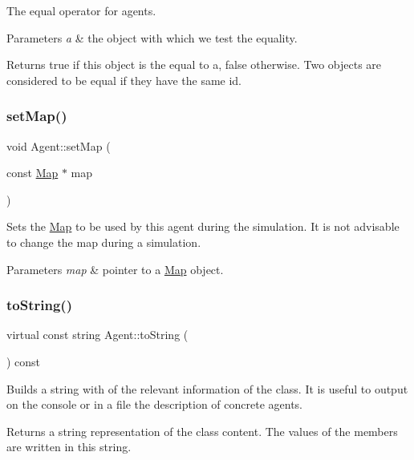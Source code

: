 The equal operator for agents. 
\begin{DoxyParams}{Parameters}
{\em a} & the object with which we test the equality. \\
\hline
\end{DoxyParams}
\begin{DoxyReturn}{Returns}
true if this object is the equal to a, false otherwise. Two objects are considered to be equal if they have the same id. 
\end{DoxyReturn}
\mbox{\label{class_agent_a87a661874cffb03fa9e474e872810260}} 
\subsubsection{\texorpdfstring{setMap()}{setMap()}}
{\footnotesize\ttfamily void Agent\+::set\+Map (\begin{DoxyParamCaption}\item[{const \mbox{\hyperlink{class_map}{Map}} $\ast$}]{map }\end{DoxyParamCaption})}

Sets the \mbox{\hyperlink{class_map}{Map}} to be used by this agent during the simulation. It is not advisable to change the map during a simulation. 
\begin{DoxyParams}{Parameters}
{\em map} & pointer to a \mbox{\hyperlink{class_map}{Map}} object. \\
\hline
\end{DoxyParams}
\mbox{\label{class_agent_a44f291596d10c7878b0641d6ec156328}} 
\subsubsection{\texorpdfstring{toString()}{toString()}}
{\footnotesize\ttfamily virtual const string Agent\+::to\+String (\begin{DoxyParamCaption}{ }\end{DoxyParamCaption}) const\hspace{0.3cm}{\ttfamily [pure virtual]}}

Builds a string with of the relevant information of the class. It is useful to output on the console or in a file the description of concrete agents. \begin{DoxyReturn}{Returns}
a string representation of the class content. The values of the members are written in this string. 
\end{DoxyReturn}



